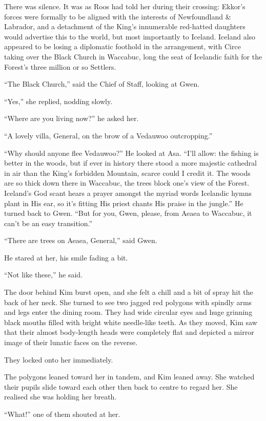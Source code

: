 \documentclass[11pt,a5paper]{article}
\begin{document}
There was silence. It was as Roos had told her during their crossing: Ekkor's forces were formally to be aligned with the interests of Newfoundland \& Labrador, and a detachment of the King's innumerable red-hatted daughters would advertise this to the world, but most importantly to Iceland. Iceland also appeared to be losing a diplomatic foothold in the arrangement, with Circe taking over the Black Church in Waccabuc, long the seat of Icelandic faith for the Forest's three million or so Settlers.

``The Black Church,'' said the Chief of Staff, looking at Gwen.

``Yes,'' she replied, nodding slowly.

``Where are you living now?'' he asked her.

``A lovely villa, General, on the brow of a Vedauwoo outcropping.''

``Why should anyone flee Vedauwoo?'' He looked at Asa. ``I'll allow: the fishing is better in the woods, but if ever in history there stood a more majestic cathedral in air than the King's forbidden Mountain, scarce could I credit it. The woods are so thick down there in Waccabuc, the trees block one's view of the Forest. Iceland's God scant hears a prayer amongst the myriad words Icelandic hymns plant in His ear, so it's fitting His priest chants His praise in the jungle.'' He turned back to Gwen. ``But for you, Gwen, please, from Aeaea to Waccabuc, it can't be an easy transition.''

``There are trees on Aeaea, General,'' said Gwen.

He stared at her, his smile fading a bit.

``Not like these,'' he said.

The door behind Kim burst open, and she felt a chill and a bit of spray hit the back of her neck. She turned to see two jagged red polygons with spindly arms and legs enter the dining room. They had wide circular eyes and huge grinning black mouths filled with bright white needle-like teeth. As they moved, Kim saw that their almost body-length heads were completely flat and depicted a mirror image of their lunatic faces on the reverse.

They locked onto her immediately.

The polygons leaned toward her in tandem, and Kim leaned away. She watched their pupils slide toward each other then back to centre to regard her. She realised she was holding her breath.

``What!'' one of them shouted at her.
\end{document}
